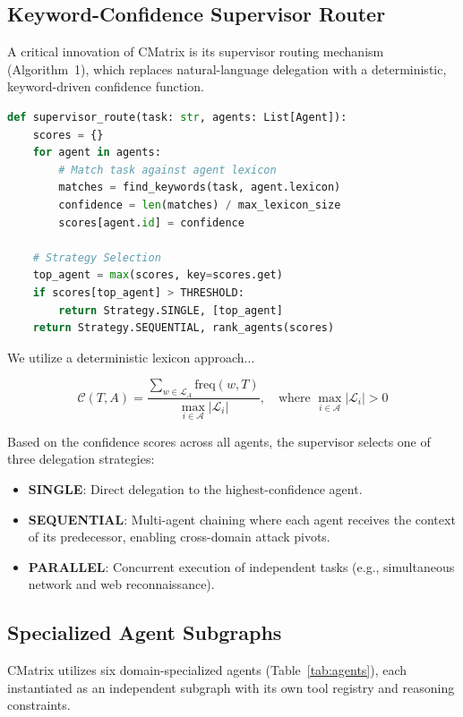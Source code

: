 \documentclass[conference,compsoc]{IEEEtran}
\begin{document}
\subsection{Keyword-Confidence Supervisor Router}
A critical innovation of CMatrix is its supervisor routing mechanism (Algorithm~1), which replaces natural-language delegation with a deterministic, keyword-driven confidence function. 

\begin{lstlisting}[language=Python, caption={CMatrix Supervisor Routing Logic}, label={alg:router}]
def supervisor_route(task: str, agents: List[Agent]):
    scores = {}
    for agent in agents:
        # Match task against agent lexicon
        matches = find_keywords(task, agent.lexicon)
        confidence = len(matches) / max_lexicon_size
        scores[agent.id] = confidence
    
    # Strategy Selection
    top_agent = max(scores, key=scores.get)
    if scores[top_agent] > THRESHOLD:
        return Strategy.SINGLE, [top_agent]
    return Strategy.SEQUENTIAL, rank_agents(scores)
\end{lstlisting}

We utilize a deterministic lexicon approach...

\begin{equation} \label{eq:confidence}
\mathcal{C}(T, A) = \frac{\sum_{w \in \mathcal{L}_A} \text{freq}(w, T)}{\max_{i \in \mathcal{A}} |\mathcal{L}_i|}, \quad \text{where } \max_{i \in \mathcal{A}} |\mathcal{L}_i| > 0
\end{equation}

Based on the confidence scores across all agents, the supervisor selects one of three delegation strategies:
\begin{itemize}
    \item \textbf{SINGLE}: Direct delegation to the highest-confidence agent.
    \item \textbf{SEQUENTIAL}: Multi-agent chaining where each agent receives the context of its predecessor, enabling cross-domain attack pivots.
    \item \textbf{PARALLEL}: Concurrent execution of independent tasks (e.g., simultaneous network and web reconnaissance).
\end{itemize}

\subsection{Specialized Agent Subgraphs}
CMatrix utilizes six domain-specialized agents (Table~\ref{tab:agents}), each instantiated as an independent subgraph with its own tool registry and reasoning constraints. 
\end{document}
